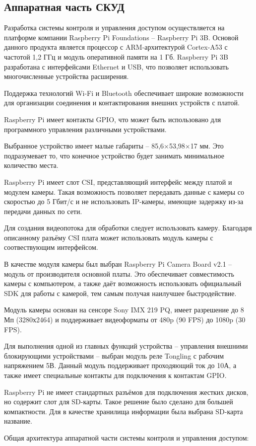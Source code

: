 \subsection{Аппаратная часть СКУД}

Разработка системы контроля и управления доступом осуществляется на платформе компании Raspberry Pi Foundations -- Raspberry Pi 3B. Основой данного продукта является процессор с ARM-архитектурой Cortex-A53 с частотой  1,2 ГГц и модуль оперативной памяти на 1 Гб. Raspberry Pi 3B разработана с интерфейсами Ethernet и USB, что позволяет использовать многочисленные устройства расширения. 

Поддержка технологий Wi-Fi и Bluetooth обеспечивает широкие возможности для организации соединения и контактирования внешних устройств с платой.

Raspberry Pi имеет контакты GPIO, что может быть использовано для программного управления различными устройствами.

Выбранное устройство имеет малые габариты -- 85,6×53,98×17 мм. Это подразумевает то, что конечное устройство будет занимать минимальное количество места. %


Raspberry Pi имеет слот CSI, представляющий интерфейс между платой и модулем камеры. Такая возможность позволяет передавать данные с камеры со скоростью до 5 Гбит/с и не использовать IP-камеры, имеющие задержку из-за передачи данных по сети.

Для создания видеопотока для обработки следует использовать камеру. Благодаря описанному разъёму CSI плата может использовать модуль камеры с соотвествующим интерфейсом.

В качестве модуля камеры был выбран Raspberry Pi Camera Board v2.1 -- модуль от производителя основной платы. Это обеспечивает совместимость камеры с компьютером, а также даёт возможность использовать официальный SDK для работы с камерой, тем самым получая наилучшее быстродействие.


Модуль камеры основан на сенсоре Sony IMX 219 PQ, имеет разрешение до 8 Мп (3280х2464) и поддерживает видеоформаты от 480p (90 FPS) до 1080p (30 FPS).

Для выполнения одной из главных функций устройства -- управления внешними блокирующими устройствами -- выбран модуль реле Tongling с рабочим напряжением 5В. Данный модуль поддерживает проходяющий ток до 10А, а также имеет специальные контакты для подключения к контактам GPIO.


Raspberry Pi не имеет стандартных разъёмов для подключения жестких дисков, но содержит слот для SD-карты. Такое решение было сделано для большей компактности. Для в качестве хранилища информации была выбрана SD-карта {название}. %

Общая архитектура аппаратной части системы контроля и управления доступом:


